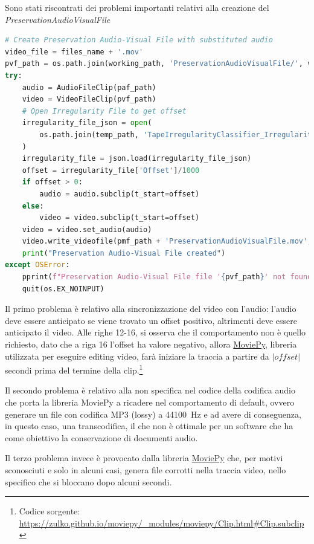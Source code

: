 Sono stati riscontrati dei problemi importanti relativi alla creazione del \textit{PreservationAudioVisualFile}

\begin{lstlisting}[language=Python, caption={Codice iniziale, creazione PreservationAudioVisualFile}]
# Create Preservation Audio-Visual File with substituted audio
video_file = files_name + '.mov'
pvf_path = os.path.join(working_path, 'PreservationAudioVisualFile/', video_file)
try:
    audio = AudioFileClip(paf_path)
    video = VideoFileClip(pvf_path)
    # Open Irregularity File to get offset
    irregularity_file_json = open(
        os.path.join(temp_path, 'TapeIrregularityClassifier_IrregularityFileOutput2.json')
    )
    irregularity_file = json.load(irregularity_file_json)
    offset = irregularity_file['Offset']/1000
    if offset > 0:
        audio = audio.subclip(t_start=offset)
    else:
        video = video.subclip(t_start=offset)
    video = video.set_audio(audio)
    video.write_videofile(pmf_path + 'PreservationAudioVisualFile.mov', bitrate='3000k', codec='mpeg4')
    print("Preservation Audio-Visual File created")
except OSError:
    pprint(f"Preservation Audio-Visual File file '{pvf_path}' not found!", color=Color.RED)
    quit(os.EX_NOINPUT)
\end{lstlisting}

Il primo problema è relativo alla sincronizzazione del video con l'audio: l'audio deve essere anticipato se viene trovato un offset positivo, altrimenti deve essere anticipato il video.
Alle righe 12-16, si osserva che il comportamento non è quello richiesto, dato che a riga 16 l'offset ha valore negativo, allora \href{https://zulko.github.io/moviepy/}{MoviePy}, libreria utilizzata per eseguire editing video, farà iniziare la traccia a partire da $|offset|$ secondi prima del termine della clip.\footnote{Codice sorgente: \url{https://zulko.github.io/moviepy/_modules/moviepy/Clip.html\#Clip.subclip}}    %

Il secondo problema è relativo alla non specifica nel codice della codifica audio che porta la libreria MoviePy a ricadere nel comportamento di default, ovvero generare un file con codifica MP3 (lossy) a \qty{44100}{\Hz} e ad avere di conseguenza, in questo caso, una transcodifica, il che non è ottimale per un software che ha come obiettivo la conservazione di documenti audio.

Il terzo problema invece è provocato dalla libreria \href{https://zulko.github.io/moviepy/}{MoviePy} che, per motivi sconosciuti e solo in alcuni casi, genera file corrotti nella traccia video, nello specifico che si bloccano dopo alcuni secondi.  %


